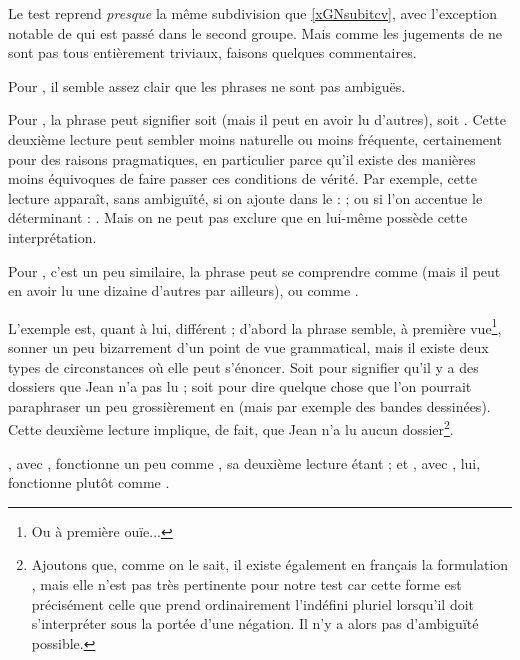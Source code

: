 Le test reprend \emph{presque} la même subdivision que \ref{xGNsubitcv}, avec l'exception notable de  qui est passé dans le second groupe. 
Mais comme les jugements de {\Last} ne sont pas tous entièrement triviaux, faisons quelques commentaires. 

Pour \Last[a--e], il semble assez clair que les phrases ne sont pas ambiguës. 

Pour \Last[f], la phrase peut signifier soit  (mais il peut en avoir lu d'autres), soit .  Cette deuxième lecture peut sembler moins naturelle ou moins fréquente, certainement pour des raisons pragmatiques, en particulier parce qu'il existe des manières moins équivoques de faire passer ces conditions de vérité. Par exemple, cette lecture apparaît, sans ambiguïté, si on ajoute  dans le {\GN} :  ; ou si l'on  accentue  le déterminant : .  Mais on ne peut pas exclure que \Last[f] en lui-même possède cette interprétation. 

Pour \Last[g], c'est un peu similaire, la phrase peut se comprendre comme  (mais il peut en avoir lu une dizaine d'autres par ailleurs), ou comme . 

L'exemple \Last[h] est, quant à lui, différent ; d'abord la phrase semble, à première vue\footnote{Ou à première ouïe...}, sonner un peu bizarrement d'un point de vue grammatical, mais il existe deux types de circonstances où elle peut s'énoncer. Soit pour signifier qu'il y a des dossiers que Jean n'a pas lu ; soit pour dire quelque chose que l'on pourrait paraphraser un peu grossièrement en  (mais par exemple des bandes dessinées). Cette deuxième lecture implique, de fait, que Jean n'a lu aucun dossier\footnote{Ajoutons que, comme on le sait, il existe également en français la formulation , mais elle n'est pas très pertinente pour notre test car cette forme  est précisément celle que prend ordinairement l'indéfini pluriel lorsqu'il doit s'interpréter sous la portée d'une négation. Il n'y a alors pas d'ambiguïté possible.}. 

\Last[i], avec , fonctionne un peu comme \Last[g], sa deuxième lecture étant  ; et \Last[j], avec , lui, fonctionne plutôt comme \Last[h]. 

